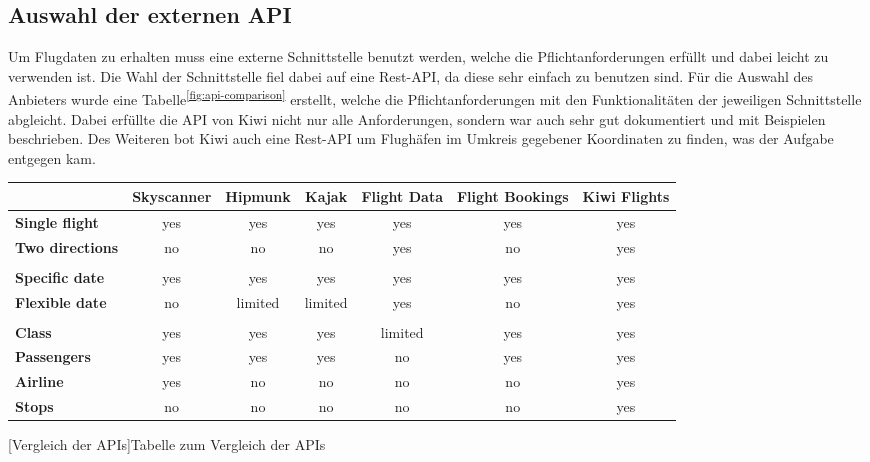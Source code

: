 \documentclass[12pt,twoside,a4paper]{article}
\begin{document}
\subsection{Auswahl der externen API}
Um Flugdaten zu erhalten muss eine externe Schnittstelle benutzt werden, welche die Pflichtanforderungen erfüllt und dabei leicht zu verwenden ist. Die Wahl der Schnittstelle fiel dabei auf eine Rest-API, da diese sehr einfach zu benutzen sind. Für die Auswahl des Anbieters wurde eine Tabelle\textsuperscript{\ref{fig:api-comparison}} erstellt, welche die Pflichtanforderungen mit den Funktionalitäten der jeweiligen Schnittstelle abgleicht. Dabei erfüllte die API von Kiwi nicht nur alle Anforderungen, sondern war auch sehr gut dokumentiert und mit Beispielen beschrieben. Des Weiteren bot Kiwi auch eine Rest-API um Flughäfen im Umkreis gegebener Koordinaten zu finden, was der Aufgabe entgegen kam.
\begin{center}
	\captionsetup{type=figure}
	\resizebox{\textwidth}{!}
	{\begin{tabular}{ l | c | c | c | c | c | c }
		& \textbf{Skyscanner} & \textbf{Hipmunk} & \textbf{Kajak} & \textbf{Flight Data} & \textbf{Flight Bookings} & \textbf{Kiwi Flights}\\
		\hline
		\textbf{Single flight} & \cellcolor{green!50}yes & \cellcolor{green!50}yes & \cellcolor{green!50}yes & \cellcolor{green!50}yes & \cellcolor{green!50}yes & \cellcolor{green!50}yes\\
		\hline
		\textbf{Two directions} & \cellcolor{red!75}no & \cellcolor{red!75}no & \cellcolor{red!75}no & \cellcolor{green!50}yes & \cellcolor{red!75}no & \cellcolor{green!50}yes\\
		\hline
		& & & & & &\\
		\hline
		\textbf{Specific date} & \cellcolor{green!50}yes & \cellcolor{green!50}yes & \cellcolor{green!50}yes & \cellcolor{green!50}yes & \cellcolor{green!50}yes & \cellcolor{green!50}yes\\
		\hline
		\textbf{Flexible date} & \cellcolor{red!75}no & \cellcolor{yellow!75}limited & \cellcolor{yellow!75}limited & \cellcolor{green!50}yes & \cellcolor{red!75}no & \cellcolor{green!50}yes\\
		\hline
		& & & & & &\\
		\hline
		\textbf{Class} & \cellcolor{green!50}yes & \cellcolor{green!50}yes & \cellcolor{green!50}yes & \cellcolor{yellow!75}limited & \cellcolor{green!50}yes & \cellcolor{green!50}yes\\
		\hline
		\textbf{Passengers} & \cellcolor{green!50}yes & \cellcolor{green!50}yes & \cellcolor{green!50}yes & \cellcolor{red!75}no & \cellcolor{green!50}yes & \cellcolor{green!50}yes\\
		\hline
		\textbf{Airline} & \cellcolor{green!50}yes & \cellcolor{red!75}no & \cellcolor{red!75}no & \cellcolor{red!75}no & \cellcolor{red!75}no & \cellcolor{green!50}yes\\
		\hline
		\textbf{Stops} & \cellcolor{red!75}no & \cellcolor{red!75}no & \cellcolor{red!75}no & \cellcolor{red!75}no & \cellcolor{red!75}no & \cellcolor{green!50}yes
	\end{tabular}}
	[Vergleich der APIs]{Tabelle zum Vergleich der APIs}
	\label{fig:api-comparison}
\end{center}
\newpage
\end{document}

